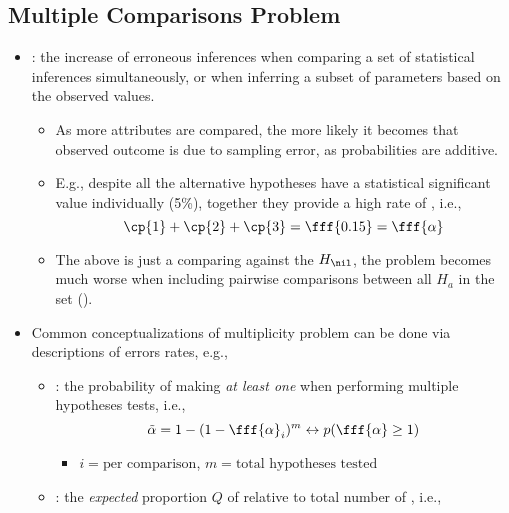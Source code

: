 \begin{itemize}
  \subsection{Multiple Comparisons Problem}
  \begin{itemize}
    \item {}: the increase of erroneous inferences when comparing a set of statistical inferences simultaneously, or when inferring a subset of parameters based on the observed values.
      \begin{itemize}
        \item As more attributes are compared, the more likely it becomes that observed outcome is due to sampling error, as probabilities are additive.
        \item E.g., despite all the alternative hypotheses have a statistical significant value individually (5\%), together they provide a high rate of \hyperref[Subsection: Statistical Errors]{}, i.e.,
        \[%
        \cp{1} + \cp{2} + \cp{3} = \fff{0.15} = \fff{\alpha}
        \]%
        \item The above is just a comparing against the \(H_\nil\), the problem becomes much worse when including pairwise comparisons between all \(H_a\) in the set ().
      \end{itemize}
    \item Common conceptualizations of multiplicity problem can be done via descriptions of errors rates, e.g.,
      \begin{itemize}
        \item {}: the probability of making \emph{at least one}  when performing multiple hypotheses tests, i.e.,
        \[%
        \tilde{\alpha} = 1 - (1-\fff{\alpha}_i)^m \leftrightarrow p(\fff{\alpha} \geq 1)
        \]%
        \begin{itemize}
          \item \(i =\text{per comparison}\), \(m=\text{total hypotheses tested}\)
        \end{itemize}
        \item {}: the \emph{expected} proportion \(Q\) of  relative to total number of , i.e.,

\end{itemize}
\end{itemize}
\end{itemize}
